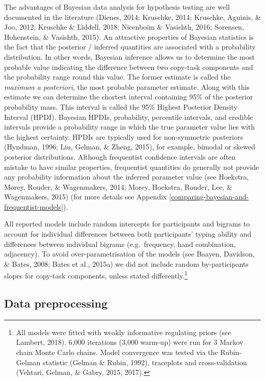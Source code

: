 \documentclass[,man,floatsintext]{apa6}
\let\rmarkdownfootnote\footnote%
\def\footnote{\protect\rmarkdownfootnote}
\begin{document}
The advantages of Bayesian data analysis for hypothesis testing are well documented in the literature (Dienes, 2014; Kruschke, 2014; Kruschke, Aguinis, \& Joo, 2012; Kruschke \& Liddell, 2018; Nicenboim \& Vasishth, 2016; Sorensen, Hohenstein, \& Vasishth, 2015). An attractive properties of Bayesian statistics is the fact that the posterior / inferred quantities are associated with a probability distribution. In other words, Bayesian inference allows us to determine the most probable value indicating the difference between two copy-task components and the probability range round this value. The former estimate is called the \textit{maximum a posteriori}, the most probable parameter estimate. Along with this estimate we can determine the shortest interval containing 95\% of the posterior probability mass. This interval is called the 95\% Highest Posterior Density Interval (HPDI). Bayesian HPDIs, probability, percentile intervals, and credible intervals provide a probability range in which the true parameter value lies with the highest certainty. HPDIs are typically used for non-symmetric posteriors (Hyndman, 1996; Liu, Gelman, \& Zheng, 2015), for example, bimodal or skewed posterior distributions. Although frequentist confidence intervals are often mistake to have similar properties, frequentist quantities do generally not provide any probability information about the inferred parameter value (see Hoekstra, Morey, Rouder, \& Wagenmakers, 2014; Morey, Hoekstra, Rouder, Lee, \& Wagenmakers, 2015) (for more details see Appendix \ref{comparing-bayesian-and-frequentist-models}).

All reported models include random intercepts for participants and bigrams to account for individual differences between both participants' typing ability and differences between individual bigrams (e.g.~frequency, hand combination, adjacency). To avoid over-parametrisation of the models (see Baayen, Davidson, \& Bates, 2008; Bates et al., 2015a) we did not include random by-participants slopes for copy-task components, unless stated differently.\footnote{All models were fitted with weakly informative regulating priors (see Lambert, 2018). 6,000 iterations (3,000 warm-up) were run for 3 Markov chain Monte Carlo chains. Model convergence was tested via the Rubin-Gelman statistic (Gelman \& Rubin, 1992), traceplots and cross-validation (Vehtari, Gelman, \& Gabry, 2015, 2017).}

\hypertarget{data-preprocessing}{%
\subsection{Data preprocessing}\label{data-preprocessing}}
\end{document}
